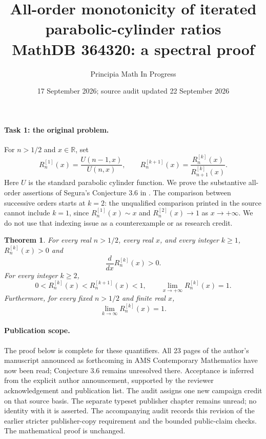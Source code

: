 \documentclass[11pt]{article}
\title{All-order monotonicity of iterated parabolic-cylinder ratios\\
\large MathDB 364320: a spectral proof}
\author{Principia Math In Progress}
\date{17 September 2026; source audit updated 22 September 2026}
\newtheorem{theorem}{Theorem}
\newcommand{\R}{\mathbb R}
\begin{document}
\maketitle

\paragraph{Task 1: the original problem.}
For $n>1/2$ and $x\in\R$, set
\[
 R_n^{[1]}(x)=\frac{U(n-1,x)}{U(n,x)},\qquad
 R_n^{[k+1]}(x)=\frac{R_n^{[k]}(x)}{R_{n+1}^{[k]}(x)}.
\]
Here $U$ is the standard parabolic cylinder function. We prove the substantive
all-order assertions of Segura's Conjecture 3.6 in \cite{Segura}.
The comparison between successive orders starts at $k=2$:
the unqualified comparison printed in the source cannot include $k=1$,
since $R_n^{[1]}(x)\sim x$ and $R_n^{[2]}(x)\to1$ as $x\to+\infty$.
We do not use that indexing issue as a counterexample or as research credit.

\begin{theorem}\label{thm:main}
For every real $n>1/2$, every real $x$, and every integer $k\ge1$,
$R_n^{[k]}(x)>0$ and
\[
 \frac{d}{dx}R_n^{[k]}(x)>0.
\]
For every integer $k\ge2$,
\[
 0<R_n^{[k]}(x)<R_n^{[k+1]}(x)<1,
 \qquad \lim_{x\to+\infty}R_n^{[k]}(x)=1.
\]
Furthermore, for every fixed $n>1/2$ and finite real $x$,
\[
 \lim_{k\to\infty}R_n^{[k]}(x)=1.
\]
\end{theorem}

\paragraph{Publication scope.}
The proof below is complete for these quantifiers. All 23 pages of the
author's manuscript announced as forthcoming in AMS Contemporary Mathematics
have now been read; Conjecture 3.6 remains unresolved there. Acceptance is
inferred from the explicit author announcement, supported by the reviewer
acknowledgement and publication list. The audit assigns one new campaign
credit on that source basis. The separate typeset publisher chapter remains
unread; no identity with it is asserted. The accompanying audit records this
revision of the earlier stricter publisher-copy requirement and the bounded
public-claim checks. The mathematical proof is unchanged.
\end{document}
